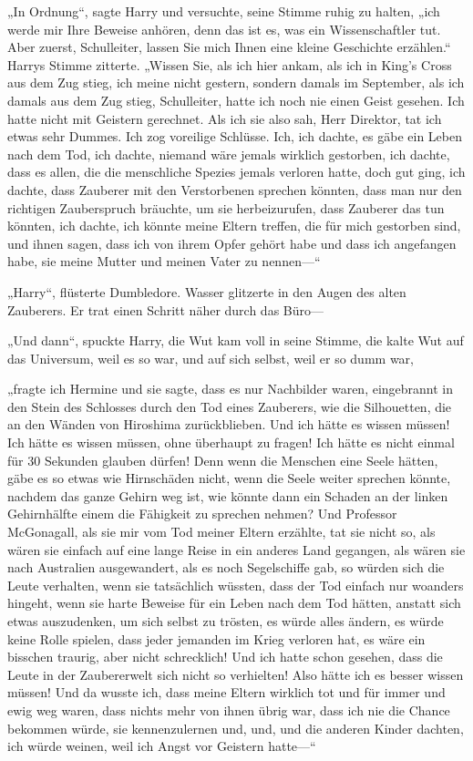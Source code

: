 {„In Ordnung“, sagte Harry und versuchte, seine Stimme ruhig zu halten, „ich werde mir Ihre Beweise anhören, denn das ist es, was ein Wissenschaftler tut. Aber zuerst, Schulleiter, lassen Sie mich Ihnen eine kleine Geschichte erzählen.“ Harrys Stimme zitterte. „Wissen Sie, als ich hier ankam, als ich in King's Cross aus dem Zug stieg, ich meine nicht gestern, sondern damals im September, als ich damals aus dem Zug stieg, Schulleiter, hatte ich noch nie einen Geist gesehen. Ich hatte nicht mit Geistern gerechnet. Als ich sie also sah, Herr Direktor, tat ich etwas sehr Dummes. Ich zog voreilige Schlüsse. Ich, ich dachte, es gäbe ein Leben nach dem Tod, ich dachte, niemand wäre jemals wirklich gestorben, ich dachte, dass es allen, die die menschliche Spezies jemals verloren hatte, doch gut ging, ich dachte, dass Zauberer mit den Verstorbenen sprechen könnten, dass man nur den richtigen Zauberspruch bräuchte, um sie herbeizurufen, dass Zauberer das tun könnten, ich dachte, ich könnte meine Eltern treffen, die für mich gestorben sind, und ihnen sagen, dass ich von ihrem Opfer gehört habe und dass ich angefangen habe, sie meine Mutter und meinen Vater zu nennen—“

„Harry“, flüsterte Dumbledore. Wasser glitzerte in den Augen des alten Zauberers. Er trat einen Schritt näher durch das Büro—

„Und dann“, spuckte Harry, die Wut kam voll in seine Stimme, die kalte Wut auf das Universum, weil es so war, und auf sich selbst, weil er so dumm war,

„fragte ich Hermine und sie sagte, dass es nur Nachbilder waren, eingebrannt in den Stein des Schlosses durch den Tod eines Zauberers, wie die Silhouetten, die an den Wänden von Hiroshima zurückblieben. Und ich hätte es wissen müssen! Ich hätte es wissen müssen, ohne überhaupt zu fragen! Ich hätte es nicht einmal für 30 Sekunden glauben dürfen! Denn wenn die Menschen eine Seele hätten, gäbe es so etwas wie Hirnschäden nicht, wenn die Seele weiter sprechen könnte, nachdem das ganze Gehirn weg ist, wie könnte dann ein Schaden an der linken Gehirnhälfte einem die Fähigkeit zu sprechen nehmen? Und Professor McGonagall, als sie mir vom Tod meiner Eltern erzählte, tat sie nicht so, als wären sie einfach auf eine lange Reise in ein anderes Land gegangen, als wären sie nach Australien ausgewandert, als es noch Segelschiffe gab, so würden sich die Leute verhalten, wenn sie tatsächlich wüssten, dass der Tod einfach nur woanders hingeht, wenn sie harte Beweise für ein Leben nach dem Tod hätten, anstatt sich etwas auszudenken, um sich selbst zu trösten, es würde alles ändern, es würde keine Rolle spielen, dass jeder jemanden im Krieg verloren hat, es wäre ein bisschen traurig, aber nicht schrecklich! Und ich hatte schon gesehen, dass die Leute in der Zaubererwelt sich nicht so verhielten! Also hätte ich es besser wissen müssen! Und da wusste ich, dass meine Eltern wirklich tot und für immer und ewig weg waren, dass nichts mehr von ihnen übrig war, dass ich nie die Chance bekommen würde, sie kennenzulernen und, und, und die anderen Kinder dachten, ich würde weinen, weil ich Angst vor Geistern hatte—“

}
